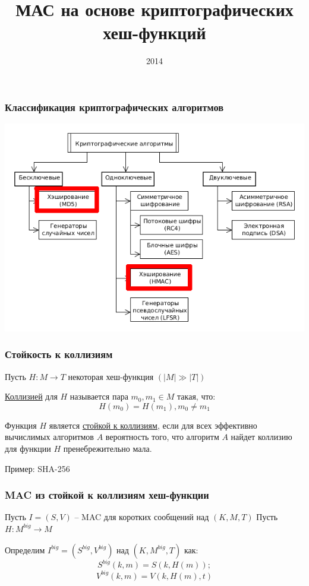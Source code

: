 \documentclass{beamer}
\title{МАС на основе криптографических хеш-функций}
\institute{ВГУ}
\date{2014}
\begin{document}
\frame{\titlepage}

\begin{frame}
  \frametitle{Классификация криптографических алгоритмов}

  \includegraphics[width=\linewidth]{./images/png/CA_classification_hash_func.png}

\end{frame}

\begin{frame}
  \frametitle{Стойкость к коллизиям}

  Пусть $H: M \rightarrow T$ некоторая хеш-функция $(|M| \gg |T|)$

  \vspace{8mm}

  \underline{Коллизией} для $H$ называется пара $m_{0}, m_{1} \in M$ такая, что:
  \[ H(m_0) = H(m_1), m_0 \neq m_1 \]

  \vspace{8mm}

  Функция $H$ является \underline{стойкой к коллизиям}, если для всех эффективно
  вычислимых алгоритмов $A$ вероятность того, что алгоритм $A$ найдет
  коллизию для функции $H$ пренебрежительно мала.

  \vspace{8mm}

  Пример: SHA-256
\end{frame}

\begin{frame}
  \frametitle{MAC из стойкой к коллизиям хеш-функции}

  Пусть $I=(S,V)$ -- MAC для коротких сообщений над $(K,M,T)$
  Пусть $H:M^{big} \rightarrow M$

  \vspace{8mm}

  Определим $I^{big} = (S^{big}, V^{big})$ над $(K, M^{big}, T)$ как:
  \[ S^{big}(k,m) = S(k, H(m));\]
  \[ V^{big}(k,m) = V(k, H(m), t)\]

\end{frame}
\end{document}
